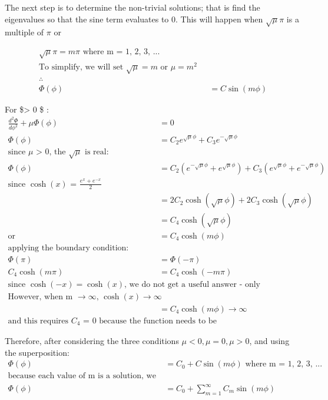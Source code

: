 \documentclass[11pt]{article}
\begin{document}
The next step is to determine the non-trivial solutions; that is find
the eigenvalues so that the sine term evaluates to 0. This will happen
when \(\sqrt{\mu}\pi\) is a multiple of \(\pi\) or

\begin{equation}
\begin{split}
\sqrt{\mu}\pi = m \pi  \text{     where m = 1, 2, 3, ... } \\
\text{To simplify, we will set $\sqrt{\mu} = m$ or $\mu = m^2$ } \\
\therefore \\
\Phi(\phi) &= C \sin(m \phi)
\end{split}
\end{equation}

For \$\mu \textgreater{} 0 \$ : \begin{equation}
\begin{split}
\frac{d^2 \Phi}{d \phi^2} + \mu \Phi(\phi) &= 0 \\
\Phi(\phi) &= C_2 e^{\sqrt{\mu}\phi} + C_3 e^{-\sqrt{\mu}\phi} \\
\text{since $\mu$ > 0, the $\sqrt{\mu}$ is real:  } \\
\Phi(\phi) &= C_2 (e^{-\sqrt{\mu}\phi} + e^{\sqrt{\mu}\phi}) + C_3 (e^{\sqrt{\mu}\phi} + e^{-\sqrt{\mu}\phi}) \\
\text{since $\cosh(x)$ = $\frac{e^x + e^{-x}}{2}$} \\
&= 2 C_2 \cosh(\sqrt{\mu}\phi) + 2 C_3 \cosh(\sqrt{\mu}\phi) \\ 
&= C_4 \cosh(\sqrt{\mu}\phi) \\
\text{or }
&= C_4 \cosh(m\phi) \\
\text{applying the boundary condition:  } \\
\Phi(\pi) &= \Phi(-\pi) \\
C_4 \cosh(m\pi) &= C_4 \cosh(-m\pi) \\
\text{since $\cosh(-x) = \cosh(x)$, we do not get a useful answer - only an identity} \\
\text{However, when m $\rightarrow \infty$, $\cosh(x) \rightarrow \infty$ }\\
&= C_4 \cosh(m\phi) \rightarrow \infty \\
\text{and this requires $C_4$ = 0 because the function needs to be bounded.}
\end{split}
\end{equation}

Therefore, after considering the three conditions
\(\mu < 0, \mu = 0, \mu > 0\), and using the superposition:
\begin{equation}
\begin{split}
\Phi(\phi) &= C_0 + C \sin(m \phi) \text{    where m = 1, 2, 3, ...} \\
\text{because each value of m is a solution, we need to sum all of these solutions } \\
\Phi(\phi) &= C_0 + \sum_{m=1}^{\infty}{C_m \sin(m \phi)} 
\end{split}
\end{equation}
\end{document}

